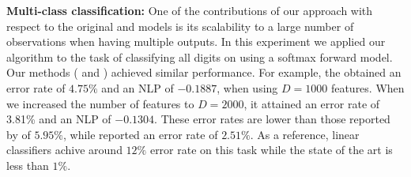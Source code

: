 \textbf{Multi-class classification:} One of the contributions of our approach with respect 
to the original \egp and \ugp models is its scalability to a large number of observations 
when having multiple outputs. In this experiment we applied our algorithm to the task
of classifying all digits on \mnist using a softmax forward model. Our methods (\eks 
and \uks) achieved similar performance. For 
example, the \eks obtained an error rate of $ 4.75\%$ and 
an NLP of $-0.1887$, when using $D=1000$ features. When we increased the number 
of features to 	$D=2000$, it attained an error rate of 3.81\% and an NLP of $-0.1304$.
These error rates  are lower than those reported by  \citet{gal-et-al-nips-2014} of $5.95\%$, 
while  \citet{dezfouli-bonilla-nips-2015} reported an error 
rate of $2.51\%$. As a reference, linear classifiers achive around $12\%$ error rate on this 
task while the state of the art is less than $1\%$. 

 



 




